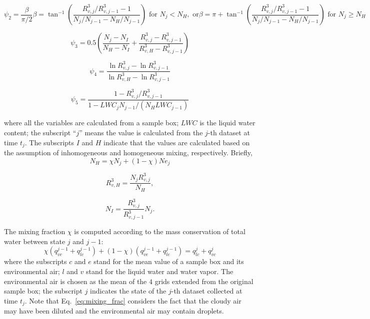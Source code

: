 \documentclass[draft,linenumbers]{AGUJournal}
\newcommand{\Eq}[1]{Eq.~\eqref{#1}} \newcommand{\Fig}[1]{Figure~\ref{#1}}
\begin{document}
\begin{subequations}
\begin{equation}
\psi_2 = \frac{\beta}{\pi/2}
\label{phi2}
\end{equation}

\begin{equation}
\beta = \tan^{-1}(\frac{R_{v,j}^3/R_{v,j-1}^3 - 1}{N_j/N_{j-1} - N_H/N_{j-1}}) \text{ for } N_j < N_H, \text{ or}
\end{equation}

\begin{equation}
\beta = \pi + \tan^{-1}(\frac{R_{v,j}^3/R_{v,j-1}^3 - 1}{N_j/N_{j-1} - N_H/N_{j-1}})  \text{ for } N_j \geq N_H
\end{equation}
\end{subequations}

\begin{equation}
\psi_3 = 0.5(\frac{N_j-N_{I}}{N_H-N_I} + \frac{R_{v,j}^3-R_{v,j-1}^3}{R_{v,H}^3 - R_{v,j-1}^3})
\label{phi3}
\end{equation}

\begin{equation}
\psi_4 = \frac{\ln R_{v,j}^3 - \ln R_{v,j-1}^3}{\ln R_{v,H}^3 - \ln R_{v,j-1}^3}
\label{phi4}
\end{equation}

\begin{equation}
\psi_5 = \frac{1 - R_{v,j}^3/R_{v,j-1}^3}{1 - LWC_{j}N_{j-1}/(N_H LWC_{j-1})}
\label{phi5}
\end{equation}

where all the variables are calculated from a sample box; $LWC$ is the liquid water content; the subscript ``$j$'' means the value is calculated from the $j$-th dataset at time $t_j$. The subscripts $I$ and $H$ indicate that the values are calculated based on the assumption of inhomogeneous and homogeneous mixing, respectively. Briefly,
\begin{equation}
N_H = \chi N_j + (1 - \chi) Ne_j
\end{equation}

\begin{equation}
R_{v,H}^3 = \frac{N_jR_{v,j}^3}{N_H},
\end{equation}

\begin{equation}
N_I = \frac{R_{v,j}^3}{R_{v,j-1}^3}N_j.
\end{equation}

The mixing fraction $\chi$ is computed according to the mass conservation of total water between state $j$ and $j-1$:
\begin{equation}
\chi(q^{j-1}_{vc} + q^{j-1}_{lc}) + (1-\chi)(q^{j-1}_{ve} + q^{j-1}_{le}) = q^{j}_{lc} + q^{j}_{vc}
\label{eq:mixing_frac}
\end{equation}
where the subscripts $c$ and $e$ stand for the mean 
value of a sample box and its environmental air; $l$ and $v$ stand for the liquid 
water and water vapor. The environmental air is chosen as the mean of the $4$ 
grids extended from the original sample box; the subscript $j$ indicates the state of the $j$-th dataset 
collected at time $t_j$. Note that \Eq{eq:mixing_frac} considers the fact that the cloudy air may have 
been diluted and the environmental air may contain droplets.
\end{document}
